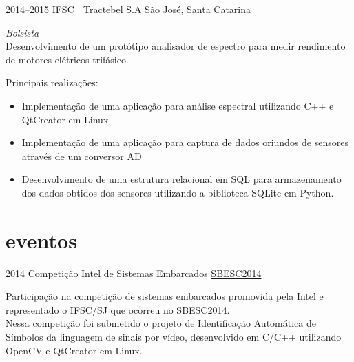 \documentclass[]{friggeri-cv} %
\begin{document}
\begin{entrylist}
\entry
{2014--2015}
{IFSC | Tractebel S.A}
{São José, Santa Catarina}
{\emph{Bolsista} \\
    
    Desenvolvimento de um protótipo analisador de espectro para medir rendimento de motores elétricos trifásico.

Principais realizações:\\

\begin{itemize}
    \item Implementação de uma aplicação para análise espectral utilizando C++ e QtCreator em Linux
    \item Implementação de uma aplicação para captura de dados oriundos de sensores através de um conversor AD
    \item Desenvolvimento de uma estrutura relacional em SQL para armazenamento dos dados obtidos dos sensores utilizando a biblioteca SQLite em Python.
\end{itemize}
}
\end{entrylist}
\pagebreak


\section{eventos}

\begin{entrylist}
\entry
{2014}
{Competição Intel de Sistemas Embarcados}
{\href{http://sbesc.lisha.ufsc.br/sbesc2014/Intel+Embedded+Systems+Competition}{SBESC2014}}
{
    
    Participação na competição de sistemas embarcados promovida pela Intel 
    e representado o IFSC/SJ que ocorreu no SBESC2014.\\

    Nessa competição foi submetido o projeto de Identificação Automática de Símbolos da linguagem de sinais por vídeo,
    desenvolvido em C/C++ utilizando OpenCV e QtCreator em Linux.

}
\end{entrylist}
\end{document}
